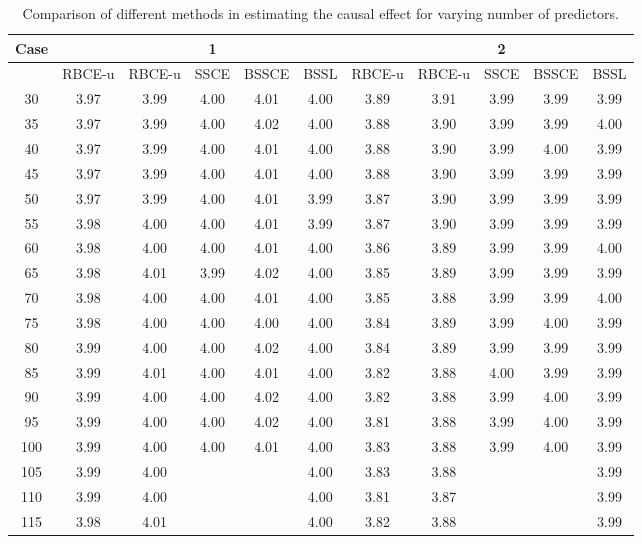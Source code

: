 \documentclass[preprint,12pt]{elsarticle}
\begin{document}
\begin{table}[ht]
\centering
\small
\caption{Comparison of different methods in estimating the causal effect for varying number of predictors.}
\begin{tabular}{c|ccccc|ccccc}
  \hline
 Case&  &  & 1 &  &  &  &  & 2 &  &  \\ 
  \hline
 & RBCE-u & RBCE-u & SSCE & BSSCE & BSSL & RBCE-u & RBCE-u & SSCE & BSSCE & BSSL \\ 
  \hline
\hline
30 & 3.97 & 3.99 & 4.00 & 4.01 & 4.00 & 3.89 & 3.91 & 3.99 & 3.99 & 3.99 \\ 
  35 & 3.97 & 3.99 & 4.00 & 4.02 & 4.00 & 3.88 & 3.90 & 3.99 & 3.99 & 4.00 \\ 
  40 & 3.97 & 3.99 & 4.00 & 4.01 & 4.00 & 3.88 & 3.90 & 3.99 & 4.00 & 3.99 \\ 
  45 & 3.97 & 3.99 & 4.00 & 4.01 & 4.00 & 3.88 & 3.90 & 3.99 & 3.99 & 3.99 \\ 
  50 & 3.97 & 3.99 & 4.00 & 4.01 & 3.99 & 3.87 & 3.90 & 3.99 & 3.99 & 3.99 \\ 
  55 & 3.98 & 4.00 & 4.00 & 4.01 & 3.99 & 3.87 & 3.90 & 3.99 & 3.99 & 3.99 \\ 
  60 & 3.98 & 4.00 & 4.00 & 4.01 & 4.00 & 3.86 & 3.89 & 3.99 & 3.99 & 4.00 \\ 
  65 & 3.98 & 4.01 & 3.99 & 4.02 & 4.00 & 3.85 & 3.89 & 3.99 & 3.99 & 3.99 \\ 
  70 & 3.98 & 4.00 & 4.00 & 4.01 & 4.00 & 3.85 & 3.88 & 3.99 & 3.99 & 4.00 \\ 
  75 & 3.98 & 4.00 & 4.00 & 4.00 & 4.00 & 3.84 & 3.89 & 3.99 & 4.00 & 3.99 \\ 
  80 & 3.99 & 4.00 & 4.00 & 4.02 & 4.00 & 3.84 & 3.89 & 3.99 & 3.99 & 3.99 \\ 
  85 & 3.99 & 4.01 & 4.00 & 4.01 & 4.00 & 3.82 & 3.88 & 4.00 & 3.99 & 3.99 \\ 
  90 & 3.99 & 4.00 & 4.00 & 4.02 & 4.00 & 3.82 & 3.88 & 3.99 & 4.00 & 3.99 \\ 
  95 & 3.99 & 4.00 & 4.00 & 4.02 & 4.00 & 3.81 & 3.88 & 3.99 & 4.00 & 3.99 \\ 
  100 & 3.99 & 4.00 & 4.00 & 4.01 & 4.00 & 3.83 & 3.88 & 3.99 & 4.00 & 3.99 \\ 
  105 & 3.99 & 4.00 &  &  & 4.00 & 3.83 & 3.88 &  &  & 3.99 \\ 
  110 & 3.99 & 4.00 &  &  & 4.00 & 3.81 & 3.87 &  &  & 3.99 \\ 
  115 & 3.98 & 4.01 &  &  & 4.00 & 3.82 & 3.88 &  &  & 3.99 \\ 

\end{tabular}
\end{table}
\end{document}
